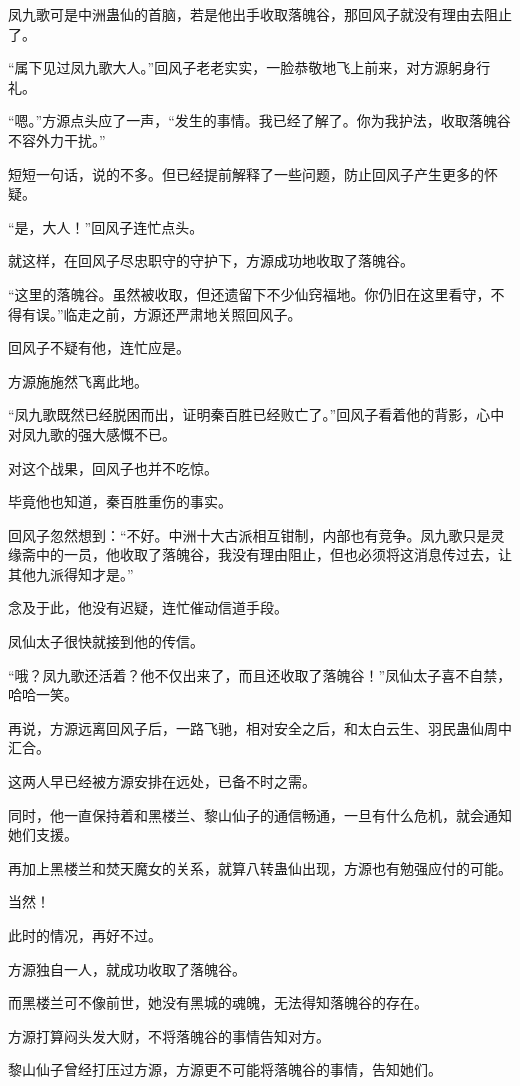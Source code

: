 \begin{this_body}
凤九歌可是中洲蛊仙的首脑，若是他出手收取落魄谷，那回风子就没有理由去阻止了。

“属下见过凤九歌大人。”回风子老老实实，一脸恭敬地飞上前来，对方源躬身行礼。

“嗯。”方源点头应了一声，“发生的事情。我已经了解了。你为我护法，收取落魄谷不容外力干扰。”

短短一句话，说的不多。但已经提前解释了一些问题，防止回风子产生更多的怀疑。

“是，大人！”回风子连忙点头。

就这样，在回风子尽忠职守的守护下，方源成功地收取了落魄谷。

“这里的落魄谷。虽然被收取，但还遗留下不少仙窍福地。你仍旧在这里看守，不得有误。”临走之前，方源还严肃地关照回风子。

回风子不疑有他，连忙应是。

方源施施然飞离此地。

“凤九歌既然已经脱困而出，证明秦百胜已经败亡了。”回风子看着他的背影，心中对凤九歌的强大感慨不已。

对这个战果，回风子也并不吃惊。

毕竟他也知道，秦百胜重伤的事实。

回风子忽然想到：“不好。中洲十大古派相互钳制，内部也有竞争。凤九歌只是灵缘斋中的一员，他收取了落魄谷，我没有理由阻止，但也必须将这消息传过去，让其他九派得知才是。”

念及于此，他没有迟疑，连忙催动信道手段。

凤仙太子很快就接到他的传信。

“哦？凤九歌还活着？他不仅出来了，而且还收取了落魄谷！”凤仙太子喜不自禁，哈哈一笑。

再说，方源远离回风子后，一路飞驰，相对安全之后，和太白云生、羽民蛊仙周中汇合。

这两人早已经被方源安排在远处，已备不时之需。

同时，他一直保持着和黑楼兰、黎山仙子的通信畅通，一旦有什么危机，就会通知她们支援。

再加上黑楼兰和焚天魔女的关系，就算八转蛊仙出现，方源也有勉强应付的可能。

当然！

此时的情况，再好不过。

方源独自一人，就成功收取了落魄谷。

而黑楼兰可不像前世，她没有黑城的魂魄，无法得知落魄谷的存在。

方源打算闷头发大财，不将落魄谷的事情告知对方。

黎山仙子曾经打压过方源，方源更不可能将落魄谷的事情，告知她们。


\end{this_body}

